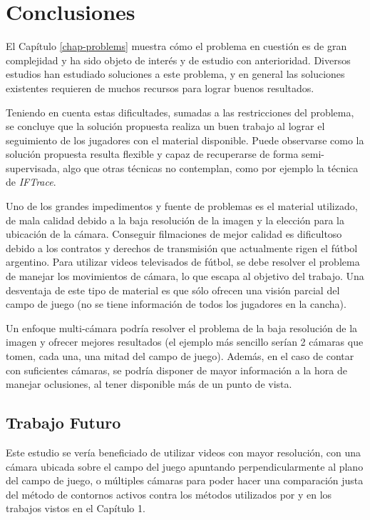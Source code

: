 \chapter{Conclusiones}
\label{chap-conclusion}

El Capítulo \ref{chap-problems} muestra cómo el problema en cuestión es de gran
complejidad y ha sido objeto de interés y de estudio con anterioridad. Diversos
estudios han estudiado soluciones a este problema, y en general las soluciones
existentes requieren de muchos recursos para lograr buenos resultados.

Teniendo en cuenta estas dificultades, sumadas a las restricciones del
problema, se concluye que la solución propuesta realiza un buen trabajo al
lograr el seguimiento de los jugadores con el material disponible. Puede
observarse como la solución propuesta resulta flexible y capaz de recuperarse
de forma semi-supervisada, algo que otras técnicas no contemplan, como por
ejemplo la técnica de \textit{IFTrace}.

Uno de los grandes impedimentos y fuente de problemas es el material utilizado,
de mala calidad debido a la baja resolución de la imagen y la elección para la
ubicación de la cámara. Conseguir filmaciones de mejor calidad es dificultoso
debido a los contratos y derechos de transmisión que actualmente rigen el
fútbol argentino. Para utilizar videos televisados de fútbol, se debe resolver
el problema de manejar los movimientos de cámara, lo que escapa al objetivo del
trabajo. Una desventaja de este tipo de material es que sólo ofrecen una visión
parcial del campo de juego (no se tiene información de todos los jugadores en
la cancha).

Un enfoque multi-cámara podría resolver el problema de la baja resolución de la
imagen y ofrecer mejores resultados (el ejemplo más sencillo serían 2 cámaras
que tomen, cada una, una mitad del campo de juego). Además, en el caso
de contar con suficientes cámaras, se podría disponer de mayor información a la
hora de manejar oclusiones, al tener disponible más de un punto de vista.

\section{Trabajo Futuro}

Este estudio se vería beneficiado de utilizar videos con mayor resolución, con
una cámara ubicada sobre el campo del juego apuntando perpendicularmente al
plano del campo de juego, o múltiples cámaras para poder hacer una comparación
justa del método de contornos activos contra los métodos utilizados por
\citeauthor{xu-8cams} y \citeauthor{papers-tanos} en los trabajos vistos en el
Capítulo 1.

